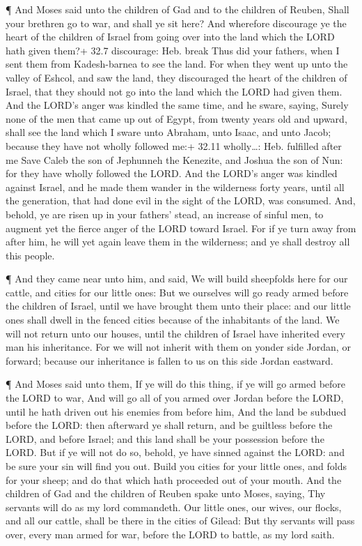  ¶ And Moses said unto the children of Gad and to the
children of Reuben, Shall your brethren go to war, and shall ye sit
here?  And wherefore discourage ye the heart of the children
of Israel from going over into the land which the LORD hath given them?+
32.7 discourage: Heb. break  Thus did your fathers, when I
sent them from Kadesh-barnea to see the land.  For when they
went up unto the valley of Eshcol, and saw the land, they discouraged
the heart of the children of Israel, that they should not go into the
land which the LORD had given them.  And the LORD's anger
was kindled the same time, and he sware, saying,  Surely
none of the men that came up out of Egypt, from twenty years old and
upward, shall see the land which I sware unto Abraham, unto Isaac, and
unto Jacob; because they have not wholly followed me:+ 32.11
wholly\ldots: Heb. fulfilled after me  Save Caleb the son
of Jephunneh the Kenezite, and Joshua the son of Nun: for they have
wholly followed the LORD.  And the LORD's anger was kindled
against Israel, and he made them wander in the wilderness forty years,
until all the generation, that had done evil in the sight of the LORD,
was consumed.  And, behold, ye are risen up in your
fathers' stead, an increase of sinful men, to augment yet the fierce
anger of the LORD toward Israel.  For if ye turn away from
after him, he will yet again leave them in the wilderness; and ye shall
destroy all this people.

 ¶ And they came near unto him, and said, We will build
sheepfolds here for our cattle, and cities for our little ones:
 But we ourselves will go ready armed before the children
of Israel, until we have brought them unto their place: and our little
ones shall dwell in the fenced cities because of the inhabitants of the
land.  We will not return unto our houses, until the
children of Israel have inherited every man his inheritance.
 For we will not inherit with them on yonder side Jordan,
or forward; because our inheritance is fallen to us on this side Jordan
eastward.

 ¶ And Moses said unto them, If ye will do this thing, if
ye will go armed before the LORD to war,  And will go all
of you armed over Jordan before the LORD, until he hath driven out his
enemies from before him,  And the land be subdued before
the LORD: then afterward ye shall return, and be guiltless before the
LORD, and before Israel; and this land shall be your possession before
the LORD.  But if ye will not do so, behold, ye have sinned
against the LORD: and be sure your sin will find you out. 
Build you cities for your little ones, and folds for your sheep; and do
that which hath proceeded out of your mouth.  And the
children of Gad and the children of Reuben spake unto Moses, saying, Thy
servants will do as my lord commandeth.  Our little ones,
our wives, our flocks, and all our cattle, shall be there in the cities
of Gilead:  But thy servants will pass over, every man
armed for war, before the LORD to battle, as my lord saith.


